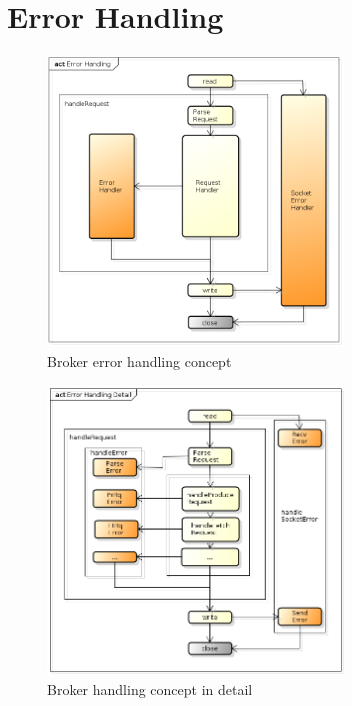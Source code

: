 \section{Error Handling}

\begin{figure}[H]
    \centering
    \includegraphics[width=0.7\textwidth]{images/broker-error-activity.png}
    \caption{Broker error handling concept}
    \label{fig:broker-error-activity.png}
\end{figure}


\begin{figure}[H]
    \centering
    \includegraphics[width=0.7\textwidth]{images/broker-error-activity-detail.png}
    \caption{Broker handling concept in detail}
    \label{fig:broker-error-activity-detail.png}
\end{figure}


